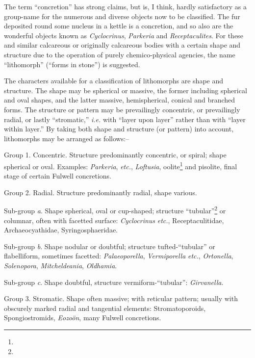 \documentclass[a4paper, 12pt, oneside]{article}
\begin{document}
The term ``concretion'' has strong claims, but is, I think, hardly satisfactory as a group-name for the numerous and diverse objects now to be classified. The fur deposited round some nucleus in a kettle is a concretion, and so also are the wonderful objects known as \emph{Cyclocrinus}, \emph{Parkeria} and \emph{Receptaculites}. For these and similar calcareous or originally calcareous bodies with a certain shape and structure due to the operation of purely chemico-physical agencies, the name ``lithomorph'' (``forms in stone'') is suggested.

The characters available for a classification of lithomorphs are shape and structure. The shape may be spherical or massive, the former including spherical and oval shapes, and the latter massive, hemispherical, conical and branched forms. The structure or pattern may be prevailingly concentric, or prevailingly radial, or lastly ``stromatic,'' \emph{i.e.} with ``layer upon layer'' rather than with ``layer within layer.'' By taking both shape and structure (or pattern) into account, lithomorphs may be arranged as follows:--
\begin{description}
    \item Group 1. Concentric. Structure predominantly concentric, or spiral; shape spherical or oval. Examples: \emph{Parkeria}, \emph{etc.}, \emph{Loftusia}, oolite\footnote{} and pisolite, final stage of certain Fulwell concretions.

    \item Group 2. Radial. Structure predominantly radial, shape various.

Sub-group \emph{a}. Shape spherical, oval or cup-shaped; structure ``tubular''\footnote{} or columnar, often with facetted surface: \emph{Cyclocrinus} \emph{etc.}, Receptaculitidae, Archaeocyathidae, Syringosphaeridae.

Sub-group \emph{b}. Shape nodular or doubtful; structure tufted-``tubular'' or flabelliform, sometimes facetted: \emph{Palaeoporella}, \emph{Vermiporella} \emph{etc.}, \emph{Ortonella}, \emph{Solenopora}, \emph{Mitcheldeania}, \emph{Oldhamia}.

Sub-group \emph{c}. Shape doubtful, structure vermiform-``tubular'': \emph{Girvanella}.

    \item Group 3. Stromatic. Shape often massive; with reticular pattern; usually with obscurely marked radial and tangential elements: Stromatoporoids, Spongiostromids, \emph{Eozoön}, many Fulwell concretions.
\end{description}
\end{document}
